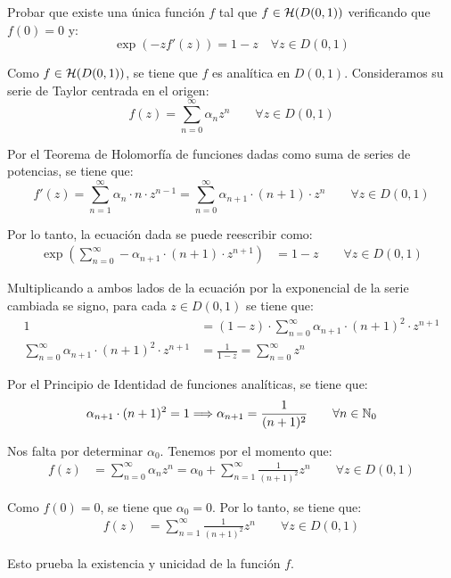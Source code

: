 \begin{ejercicio}
    Probar que existe una única función $f$ tal que $f \in \mathcal{H}(D(0,1))$ verificando que $f(0) = 0$ y:
    \begin{equation*}
        \exp\left({-z} f'(z)\right) = 1-z \quad \forall z \in D(0,1)
    \end{equation*}

    Como $f\in \mathcal{H}(D(0,1))$, se tiene que $f$ es analítica en $D(0,1)$. Consideramos su serie de Taylor centrada en el origen:
    \begin{equation*}
        f(z) = \sum_{n=0}^{\infty} \alpha_n z^n \qquad \forall z \in D(0,1)
    \end{equation*}

    Por el Teorema de Holomorfía de funciones dadas como suma de series de potencias, se tiene que:
    \begin{equation*}
        f'(z) = \sum_{n=1}^{\infty} \alpha_n\cdot n\cdot z^{n-1}
        = \sum_{n=0}^{\infty} \alpha_{n+1}\cdot (n+1)\cdot z^{n} \qquad \forall z \in D(0,1)
    \end{equation*}

    Por lo tanto, la ecuación dada se puede reescribir como:
    \begin{align*}
        \exp\left(\sum_{n=0}^{\infty} -\alpha_{n+1}\cdot (n+1)\cdot z^{n+1}\right) &= 1-z\qquad \forall z \in D(0,1)
    \end{align*}

    Multiplicando a ambos lados de la ecuación por la exponencial de la serie cambiada se signo, para cada $z \in D(0,1)$ se tiene que:
    \begin{align*}
        1 &= (1-z)\cdot \sum_{n=0}^{\infty} \alpha_{n+1}\cdot (n+1)^2\cdot z^{n+1}\\
        \sum_{n=0}^{\infty} \alpha_{n+1}\cdot (n+1)^2\cdot z^{n+1} &= \frac{1}{1-z} = \sum_{n=0}^{\infty} z^{n}   
    \end{align*}

    Por el Principio de Identidad de funciones analíticas, se tiene que:
    \begin{equation*}
        \alpha_{n+1}\cdot (n+1)^2 = 1\Longrightarrow \alpha_{n+1} = \frac{1}{(n+1)^2} \qquad \forall n \in \mathbb{N}_0
    \end{equation*}

    Nos falta por determinar $\alpha_0$. Tenemos por el momento que:
    \begin{align*}
        f(z) &= \sum_{n=0}^{\infty} \alpha_n z^n = \alpha_0 + \sum_{n=1}^{\infty} \frac{1}{(n+1)^2} z^n\qquad \forall z \in D(0,1)
    \end{align*}

    Como $f(0)=0$, se tiene que $\alpha_0=0$. Por lo tanto, se tiene que:
    \begin{align*}
        f(z) &= \sum_{n=1}^{\infty} \frac{1}{(n+1)^2} z^n\qquad \forall z \in D(0,1)
    \end{align*}

    Esto prueba la existencia y unicidad de la función $f$.
\end{ejercicio}

